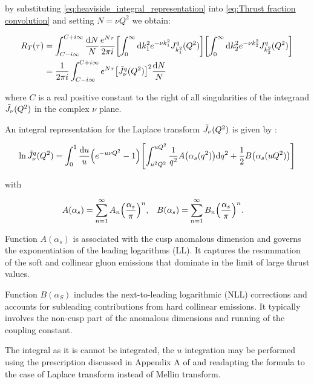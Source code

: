 \documentclass[../main.tex]{subfiles}
\begin{document}
by substituting \cref{eq:heaviside_integral_representation} into \cref{eq:Thrust fraction convolution} and setting $N= \nu Q^2$ we obtain:

\begin{align}
    \begin{split} \label{eq:Thrust fraction}
    R_T(\tau) &= \int_{C - i \infty}^{C + i\infty} \frac{\dd N}{N} \frac{e^{N \tau}}{2\pi i} \qty[\int_0^\infty \dd k_1^2 e^{-\nu k_1^2} J^q_{k_1^2}(Q^2) ] \qty[\int_0^\infty \dd k_2^2 e^{-\nu k_2^2} J^q_{k_2^2}(Q^2)]\\
    &=\frac{1}{2\pi i}\int_{C - i \infty}^{C + i\infty} e^{N \tau} \qty[\Tilde{J}_\nu^q(Q^2)]^2 \frac{\dd N}{N}
    \end{split}
\end{align}

where $C$ is a real positive constant to the right of all singularities of the integrand $\Tilde{J}_\nu(Q^2)$ in the complex $\nu$ plane. 

An integral representation for the Laplace transform $\Tilde{J}_\nu(Q^2)$ is given by \cite{CATANI19933}:

\begin{equation}
    \ln \Tilde{J}_\nu^q(Q^2) = \int_0^1 \frac{\dd u}{u} \qty(e^{-u \nu Q^2}-1)\qty[ \int_{u^2 Q^2}^{u Q^2} \frac{1}{q^2} A\qty(\alpha_s(q^2)) \dd q^2 + \frac{1}{2} B\qty(\alpha_s(u Q^2))]
\end{equation}

with 

\begin{align*}
    A(\alpha_s) &= \sum_{n=1}^\infty A_n \qty(\frac{\alpha_s}{\pi})^n , & B(\alpha_s) &= \sum_{n=1}^\infty B_n\qty(\frac{\alpha_s}{\pi})^n .
\end{align*}

Function $A(\alpha_s)$ is associated with the cusp anomalous dimension and governs the exponentiation of the leading logarithms (LL). 
It captures the resummation of the soft and collinear gluon emissions that dominate in the limit of large thrust values.

Function $B(\alpha_S)$ includes the next-to-leading logarithmic (NLL) corrections and accounts for subleading contributions from hard collinear emissions.
It typically involves the non-cusp part of the anomalous dimensions and running of the coupling constant.

The integral as it is cannot be integrated, the $u$ integration may be performed using the prescription discussed in Appendix A of \cite{Catani_2003_appendix} and
readapting the formula to the case of Laplace transform instead of Mellin transform.
\end{document}
